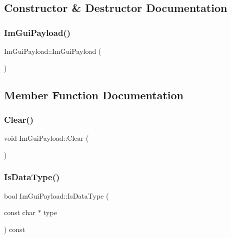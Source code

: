 \subsection{Constructor \& Destructor Documentation}
\hypertarget{struct_im_gui_payload_a341c0039af838af0308a7449f8c1308b}{}\label{struct_im_gui_payload_a341c0039af838af0308a7449f8c1308b} 
\subsubsection{\texorpdfstring{Im\+Gui\+Payload()}{ImGuiPayload()}}
{\footnotesize\ttfamily Im\+Gui\+Payload\+::\+Im\+Gui\+Payload (\begin{DoxyParamCaption}{ }\end{DoxyParamCaption})}



\subsection{Member Function Documentation}
\hypertarget{struct_im_gui_payload_a88c2293d356eb05e7a30d7693de186f2}{}\label{struct_im_gui_payload_a88c2293d356eb05e7a30d7693de186f2} 
\subsubsection{\texorpdfstring{Clear()}{Clear()}}
{\footnotesize\ttfamily void Im\+Gui\+Payload\+::\+Clear (\begin{DoxyParamCaption}{ }\end{DoxyParamCaption})}

\hypertarget{struct_im_gui_payload_a7864aeb80bc28683748d015562eead4d}{}\label{struct_im_gui_payload_a7864aeb80bc28683748d015562eead4d} 
\subsubsection{\texorpdfstring{Is\+Data\+Type()}{IsDataType()}}
{\footnotesize\ttfamily bool Im\+Gui\+Payload\+::\+Is\+Data\+Type (\begin{DoxyParamCaption}\item[{const char $\ast$}]{type }\end{DoxyParamCaption}) const}

